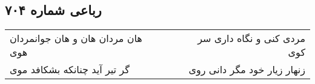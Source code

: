 \begin{center}
\section*{رباعی شماره ۷۰۴}
\label{sec:sh704}
\begin{longtable}{l p{0.5cm} r}
هان مردان هان و هان جوانمردان هوی
&&
مردی کنی و نگاه داری سر کوی
\\
گر تیر آید چنانکه بشکافد موی
&&
زنهار زیار خود مگر دانی روی
\\
\end{longtable}
\end{center}
